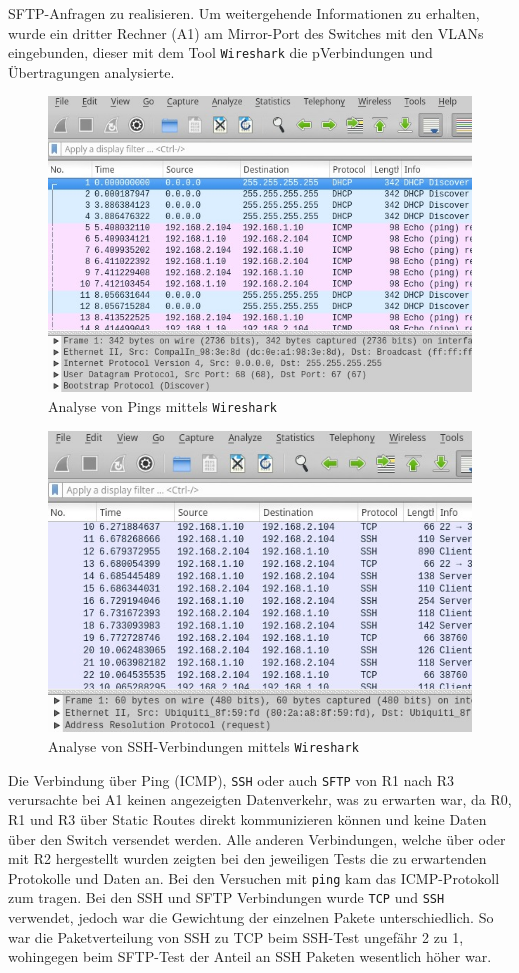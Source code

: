 \documentclass[11pt,a4paper]{article}
\begin{document}
SFTP-Anfragen zu realisieren. Um weitergehende Informationen zu
erhalten, wurde ein dritter Rechner (A1) am Mirror-Port des Switches
mit den VLANs eingebunden, dieser mit dem Tool \texttt{Wireshark} die
pVerbindungen und Übertragungen analysierte.
\begin{figure}[H]
  \includegraphics[width=\linewidth]{./wireshark1.jpeg}
  \centering
  \caption{Analyse von Pings mittels \texttt{Wireshark}}
\end{figure}
\begin{figure}[H]
  \includegraphics[width=\linewidth]{./wireshark2.jpeg}
  \centering
  \caption{Analyse von SSH-Verbindungen mittels \texttt{Wireshark}}
\end{figure}
\par
Die Verbindung über Ping (ICMP), \texttt{SSH} oder auch \texttt{SFTP}
von R1 nach R3 verursachte bei A1 keinen angezeigten Datenverkehr, was
zu erwarten war, da R0, R1 und R3 über Static Routes direkt
kommunizieren können und keine Daten über den Switch versendet werden.
Alle anderen Verbindungen, welche über oder mit R2 hergestellt wurden
zeigten bei den jeweiligen Tests die zu erwartenden Protokolle und
Daten an. Bei den Versuchen mit \texttt{ping} kam das ICMP-Protokoll
zum tragen. Bei den SSH und SFTP Verbindungen wurde \texttt{TCP} und
\texttt{SSH} verwendet, jedoch war die Gewichtung der einzelnen Pakete
unterschiedlich. So war die Paketverteilung von SSH zu TCP beim
SSH-Test ungefähr 2 zu 1, wohingegen beim SFTP-Test der Anteil an SSH
Paketen wesentlich höher war.
\end{document}
